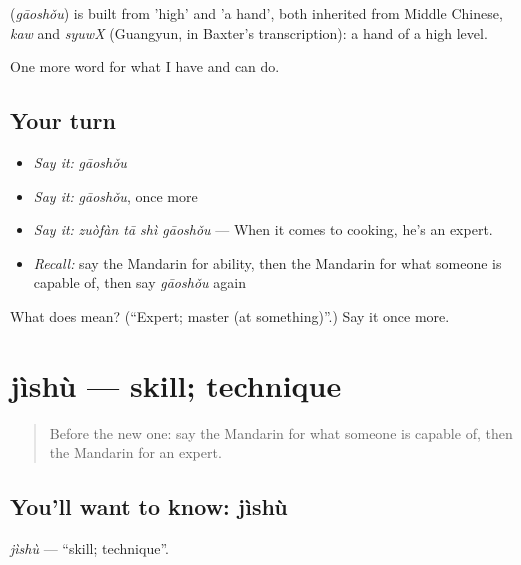 \begin{cousinweb}
\textbf{} (\emph{gāoshǒu}) is built from  'high' and  'a hand', both inherited from Middle Chinese, \emph{kaw} and \emph{syuwX} (Guangyun, in Baxter's transcription): a hand of a high level.
\end{cousinweb}

\begin{grammarlens}[title={What you've built}]
One more word for what I have and can do.
\end{grammarlens}

\subsection*{Your turn}
\begin{itemize}
\raggedright
  \item \emph{Say it:} \emph{gāoshǒu}
  \item \emph{Say it:} \emph{gāoshǒu}, once more
  \item \emph{Say it:} \emph{zuòfàn tā shì gāoshǒu} — When it comes to cooking, he's an expert.
  \item \emph{Recall:} say the Mandarin for ability, then the Mandarin for what someone is capable of, then say \emph{gāoshǒu} again
\end{itemize}

\begin{tcolorbox}[breakable,colback=teal!4,colframe=teal!35!black,title={Before you move on}]
What does  mean? (\textquotedblleft{}Expert; master (at something)\textquotedblright{}.) Say it once more.
\end{tcolorbox}
\section[jìshù]{jìshù — skill; technique}

\label{lesson:ZH-C260-jishu}



\begin{quote}
Before the new one: say the Mandarin for what someone is capable of, then the Mandarin for an expert.
\end{quote}

\subsection*{You'll want to know: jìshù}
\emph{jìshù} — \textquotedblleft{}skill; technique\textquotedblright{}.

